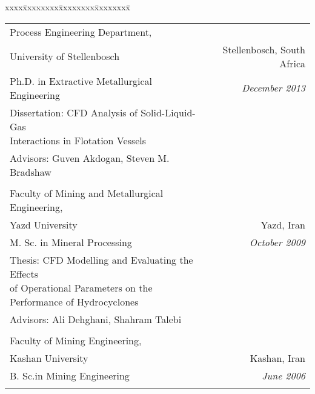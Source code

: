 \documentclass[10pt,a4]{article}
\newcommand{\quotes}[1]{``#1''}
\begin{document}
\begin{small}
\begin{tabbing}
xxxx\=xxxxxxxx\=xxxxxxxx\=xxxxxxxx\=\kill

\>\begin{tabular*}{0.97\linewidth}{l@{\extracolsep{\fill}}r}


Process Engineering Department, \\
University of Stellenbosch & Stellenbosch, South Africa\\
Ph.D. in  Extractive Metallurgical Engineering & 
{\it December 2013}\\
Dissertation: \quotes{CFD Analysis of Solid-Liquid-Gas \\Interactions in Flotation Vessels}\\
Advisors: Guven Akdogan, Steven M. Bradshaw \\
 & \\

Faculty of Mining and Metallurgical Engineering, \\
Yazd University & Yazd, Iran \\
M. Sc. in Mineral Processing &
{\it October 2009} \\
Thesis: \quotes{CFD Modelling and Evaluating the Effects \\of Operational Parameters
on the Performance of Hydrocyclones}\\
Advisors: Ali Dehghani, Shahram Talebi \\
 & \\

Faculty of Mining Engineering, \\
Kashan University & Kashan, Iran \\
B. Sc.in Mining Engineering &
{\it June 2006}\\
 & \\

\end{tabular*}
\end{tabbing}

%
%


\end{small}
\end{document}
